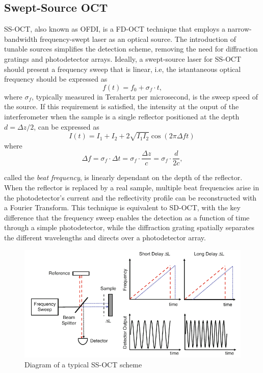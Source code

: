 \subsection{Swept-Source OCT}
\acf{SS-OCT}, also known as \ac{OFDI}, is a \ac{FD-OCT} technique that employs a narrow-bandwidth frequency-swept laser as an optical source. The introduction of tunable sources simplifies the detection scheme, removing the need for diffraction gratings and photodetector arrays. Ideally, a swept-source laser for \ac{SS-OCT} should present a frequency sweep that is linear, i.e, the istantaneous optical frequency should be expressed as
\begin{equation}\label{eq:frequency-sweep-linear}
	f(t) = f_0 + \sigma_f \cdot t,
\end{equation}
where $\sigma_f$, typically measured in Terahertz per microsecond, is the sweep speed of the source. If this requirement is satisfied, the intensity at the ouput of the interferometer when the sample is a single reflector positioned at the depth $d = \Delta z/2$, can be expressed as
\begin{equation}
	I(t) = I_1 + I_2 + 2\sqrt{I_1I_2}\cos\left( 2\pi \Delta f  t\right)\,
\end{equation}
where 
\begin{equation}
	\Delta f = \sigma_f \cdot \Delta t = \sigma_f \cdot \frac{\Delta z}{c} = \sigma_f \cdot \frac{d}{2c},
\end{equation}

 called the \emph{beat frequency}, is linearly dependant on the depth of the reflector. When the reflector is replaced by a real sample, multiple beat frequencies arise in the photodetector's current and the reflectivity profile can be reconstructed with a Fourier Transform. This technique is equivalent to \ac{SD-OCT}, with the key difference that the frequency sweep enables the detection as a function of time through a simple photodetector, while the diffraction grating spatially separates the different wavelengths and directs over a photodetector array.


\begin{figure}[hbt]
	\myfloatalign
	\includegraphics[width=\linewidth]{gfx/ch2/ssoct}
	\caption{Diagram of a typical SS-OCT scheme \cite{Drexler2015}}\label{fig:ssoct}
\end{figure}

